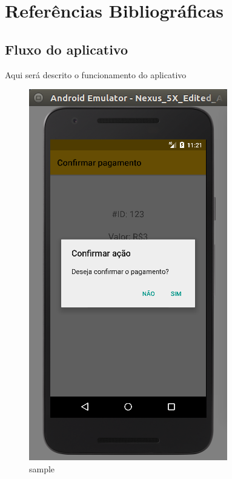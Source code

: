 \documentclass[hidelinks,12pt]{article}
\begin{document}
\section*{Refer\^encias Bibliogr\'aficas}
\renewcommand\refname{}


\newpage
\appendix
\renewcommand\thefigure{\thesection.\arabic{figure}}
\setcounter{figure}{0} 
\begin{appendices}
	\section{Fluxo do aplicativo}
	Aqui ser\'a descrito o funcionamento do aplicativo
	
	\begin{figure}[h]
		\centering
		\includegraphics[scale=0.2]{int:confirm_confirm}
		\caption{sample}
		\label{sample}
	\end{figure}
\end{appendices}
\end{document}
